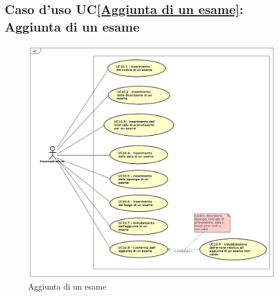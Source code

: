 \subsection{Caso d'uso UC\ref{Aggiunta di un esame}: Aggiunta di un esame}
\begin{figure} [H]
	\centering
	\includegraphics[scale=0.45]{./img/UseCaseDiagram010.png}
	\caption{Aggiunta di un esame}\label{}
\end{figure}
